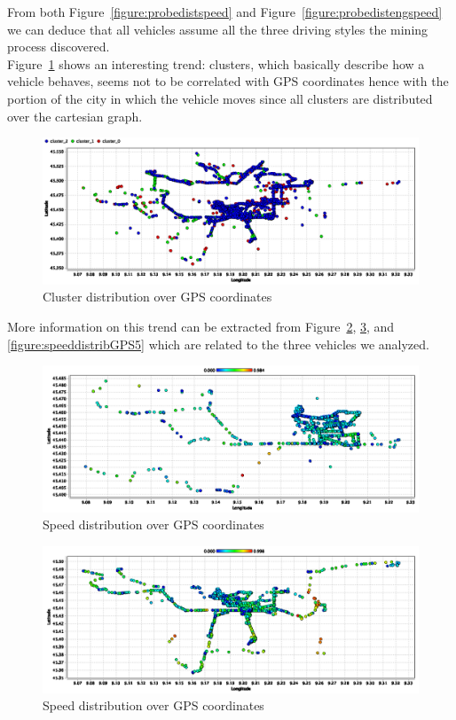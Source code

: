 From both Figure~\ref{figure:probedistspeed} and Figure~\ref{figure:probedistengspeed} we can deduce that all vehicles assume all the three driving styles the mining process discovered.\\

Figure~\ref{figure:clustersdistribGPS} shows an interesting trend: clusters, which basically describe how a vehicle behaves, seems not to be correlated with GPS coordinates hence with the portion of the city in which the vehicle moves since all clusters are distributed over the cartesian graph.

\begin{figure}[h!]
\centerline{\includegraphics[width=\textwidth]{images/cluster_distrib_long_lat.png}}
\caption{Cluster distribution over GPS coordinates}
\label{figure:clustersdistribGPS}
\end{figure}

More information on this trend can be extracted from Figure~\ref{figure:speeddistribGPS1}, \ref{figure:speeddistribGPS3}, and \ref{figure:speeddistribGPS5} which are related to the three vehicles we analyzed.

\begin{figure}[h!]
\centerline{\includegraphics[width=\textwidth]{images/1_speed_distrib.png}}
\caption{Speed distribution over GPS coordinates}
\label{figure:speeddistribGPS1}
\end{figure}

\begin{figure}[h!]
\centerline{\includegraphics[width=\textwidth]{images/3_speed_distrib.png}}
\caption{Speed distribution over GPS coordinates}
\label{figure:speeddistribGPS3}
\end{figure}

